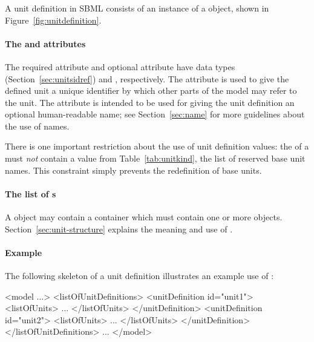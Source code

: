 \subsubsection{}
\label{sec:unitdefinition-structure}

A unit definition in SBML consists of an instance of a
\UnitDefinition object, shown in Figure~\ref{fig:unitdefinition}.


\paragraph{The  and  attributes}

The required attribute  and optional attribute
 have data types 
(Section~\ref{sec:unitsidref}) and ,
respectively.  The  attribute is used to give the
defined unit a unique identifier by which other parts of the model
may refer to the unit.  The  attribute is intended to
be used for giving the unit definition an optional human-readable
name; see Section~\ref{sec:name} for more guidelines about the use
of names.

There is one important restriction about the use of unit
definition  values: the  of a \UnitDefinition
must \emph{not} contain a value from Table~\ref{tab:unitkind}, the
list of reserved base unit names.  This constraint simply prevents
the redefinition of base units.


\paragraph{The list of s}
\label{sec:listofunits}

A \UnitDefinition object may contain a \ListOfUnits container which must
contain one or more \Unit objects. Section~\ref{sec:unit-structure} explains
the meaning and use of \Unit.   

\paragraph{Example}

The following skeleton of a unit definition illustrates an example
use of \UnitDefinition:

\begin{example}
<model ...>
    <listOfUnitDefinitions>
        <unitDefinition id="unit1">
            <listOfUnits>
                ...
            </listOfUnits>
        </unitDefinition>
        <unitDefinition id="unit2">
            <listOfUnits>
                ...
            </listOfUnits>
        </unitDefinition>
    </listOfUnitDefinitions>
    ...
</model>
\end{example}


